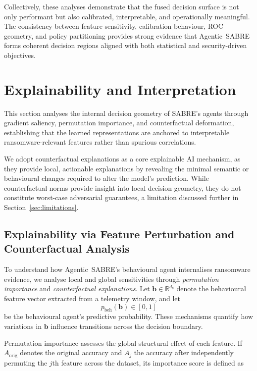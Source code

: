 \documentclass[lettersize,journal]{IEEEtran}
\begin{document}
Collectively, these analyses demonstrate that the fused decision surface is not only performant but also calibrated, interpretable, and operationally meaningful. The consistency between feature sensitivity, calibration behaviour, ROC geometry, and policy partitioning provides strong evidence that Agentic~SABRE forms coherent decision regions aligned with both statistical and security-driven objectives.


\section{Explainability and Interpretation}
\label{sec:explainability}


\cbstart
This section analyses the internal decision geometry of SABRE's agents through gradient
saliency, permutation importance, and counterfactual deformation, establishing that the
learned representations are anchored to interpretable ransomware-relevant features rather
than spurious correlations.
\cbend


We adopt counterfactual explanations as a core explainable AI mechanism, as they provide local, actionable explanations by revealing the minimal semantic or behavioural changes required to alter the model’s prediction. While counterfactual norms provide insight into local decision geometry, they do not constitute worst-case adversarial guarantees, a limitation discussed further in Section~\ref{sec:limitations}.

\subsection{Explainability via Feature Perturbation and Counterfactual Analysis}
\label{sec:behavioural_explainability}

To understand how Agentic~SABRE’s behavioural agent internalises ransomware evidence, we analyse local and global sensitivities through \emph{permutation importance} and \emph{counterfactual explanations}. Let $\mathbf{b}\in\mathbb{R}^{d_b}$ denote the behavioural feature vector extracted from a telemetry window, and let
\begin{equation}
p_{\mathrm{beh}}(\mathbf{b}) \in [0,1]
\label{eq:beh_score}
\end{equation}
be the behavioural agent's predictive probability. These mechanisms quantify how variations in $\mathbf{b}$ influence transitions across the decision boundary.

Permutation importance assesses the global structural effect of each feature. If $A_{\text{orig}}$ denotes the original accuracy and $A_j$ the accuracy after independently permuting the $j$th feature across the dataset, its importance score is defined as
\end{document}
